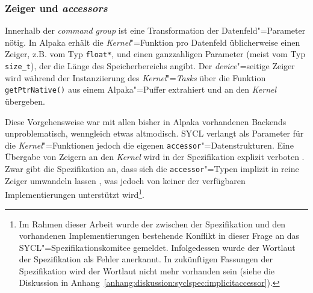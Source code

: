 \subsubsection{Zeiger und \textit{accessors}}

Innerhalb der \textit{command group} ist eine Transformation der
Datenfeld"=Parameter nötig. In Alpaka erhält die \textit{Kernel}"=Funktion pro
Datenfeld üblicherweise einen Zeiger, z.B. vom Typ \texttt{float*}, und einen
ganzzahligen Parameter (meist vom Typ \texttt{size\_t}), der die Länge des
Speicherbereichs angibt. Der \textit{device}"=seitige Zeiger wird während der
Instanziierung des \textit{Kernel}"=\textit{Tasks} über die Funktion
\texttt{getPtrNative()} aus einem Alpaka"=Puffer extrahiert und an den
\textit{Kernel} übergeben.

Diese Vorgehensweise war mit allen bisher in Alpaka vorhandenen Backends
unproblematisch, wenngleich etwas altmodisch. SYCL verlangt als Parameter für
die \textit{Kernel}"=Funktionen jedoch die eigenen \texttt{accessor}"=Datenstrukturen.
Eine Übergabe von Zeigern an den \textit{Kernel} wird in der Spezifikation explizit
verboten \cite[vgl.][192]{sycl2019}. Zwar gibt die Spezifikation an, dass sich
die \texttt{accessor}"=Typen implizit in reine Zeiger umwandeln lassen
\cite[vgl.][27]{sycl2019}, was jedoch von keiner der verfügbaren
Implementierungen unterstützt wird\footnote{Im Rahmen dieser Arbeit wurde der
zwischen der Spezifikation und den vorhandenen Implementierungen bestehende
Konflikt in dieser Frage an das SYCL"=Spezifikationskomitee gemeldet.
Infolgedessen wurde der Wortlaut der Spezifikation als Fehler anerkannt. In
zukünftigen Fassungen der Spezifikation wird der Wortlaut nicht mehr vorhanden
sein (siehe die Diskussion in
Anhang~\ref{anhang:diskussion:syclspec:implicitaccessor}).}.

